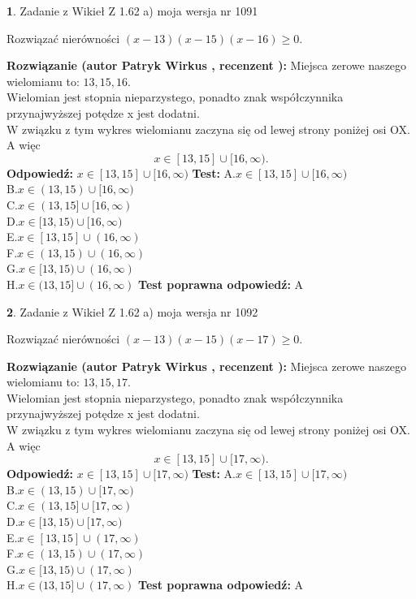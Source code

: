 \documentclass[12pt, a4paper]{article}
\theoremstyle{definition} %
\newtheorem{zad}{}
\newcommand{\zadStart}[1]{\begin{zad}#1\newline}
\newcommand{\zadStop}{\end{zad}}
\newcommand{\rozwStart}[2]{\noindent \textbf{Rozwiązanie (autor #1 , recenzent #2): }\newline}
\newcommand{\rozwStop}{\newline}
\newcommand{\odpStart}{\noindent \textbf{Odpowiedź:}\newline}
\newcommand{\odpStop}{\newline}
\newcommand{\testStart}{\noindent \textbf{Test:}\newline}
\newcommand{\testStop}{\newline}
\newcommand{\kluczStart}{\noindent \textbf{Test poprawna odpowiedź:}\newline}
\newcommand{\kluczStop}{\newline}
\begin{document}
\zadStart{Zadanie z Wikieł Z 1.62 a) moja wersja nr 1091}

Rozwiązać nierówności $(x-13)(x-15)(x-16)\ge0$.
\zadStop
\rozwStart{Patryk Wirkus}{}
Miejsca zerowe naszego wielomianu to: $13, 15, 16$.\\
Wielomian jest stopnia nieparzystego, ponadto znak współczynnika przy\linebreak najwyższej potędze x jest dodatni.\\ W związku z tym wykres wielomianu zaczyna się od lewej strony poniżej osi OX. A więc $$x \in [13,15] \cup [16,\infty).$$
\rozwStop
\odpStart
$x \in [13,15] \cup [16,\infty)$
\odpStop
\testStart
A.$x \in [13,15] \cup [16,\infty)$\\
B.$x \in (13,15) \cup [16,\infty)$\\
C.$x \in (13,15] \cup [16,\infty)$\\
D.$x \in [13,15) \cup [16,\infty)$\\
E.$x \in [13,15] \cup (16,\infty)$\\
F.$x \in (13,15) \cup (16,\infty)$\\
G.$x \in [13,15) \cup (16,\infty)$\\
H.$x \in (13,15] \cup (16,\infty)$
\testStop
\kluczStart
A
\kluczStop



\zadStart{Zadanie z Wikieł Z 1.62 a) moja wersja nr 1092}

Rozwiązać nierówności $(x-13)(x-15)(x-17)\ge0$.
\zadStop
\rozwStart{Patryk Wirkus}{}
Miejsca zerowe naszego wielomianu to: $13, 15, 17$.\\
Wielomian jest stopnia nieparzystego, ponadto znak współczynnika przy\linebreak najwyższej potędze x jest dodatni.\\ W związku z tym wykres wielomianu zaczyna się od lewej strony poniżej osi OX. A więc $$x \in [13,15] \cup [17,\infty).$$
\rozwStop
\odpStart
$x \in [13,15] \cup [17,\infty)$
\odpStop
\testStart
A.$x \in [13,15] \cup [17,\infty)$\\
B.$x \in (13,15) \cup [17,\infty)$\\
C.$x \in (13,15] \cup [17,\infty)$\\
D.$x \in [13,15) \cup [17,\infty)$\\
E.$x \in [13,15] \cup (17,\infty)$\\
F.$x \in (13,15) \cup (17,\infty)$\\
G.$x \in [13,15) \cup (17,\infty)$\\
H.$x \in (13,15] \cup (17,\infty)$
\testStop
\kluczStart
A
\kluczStop
\end{document}
